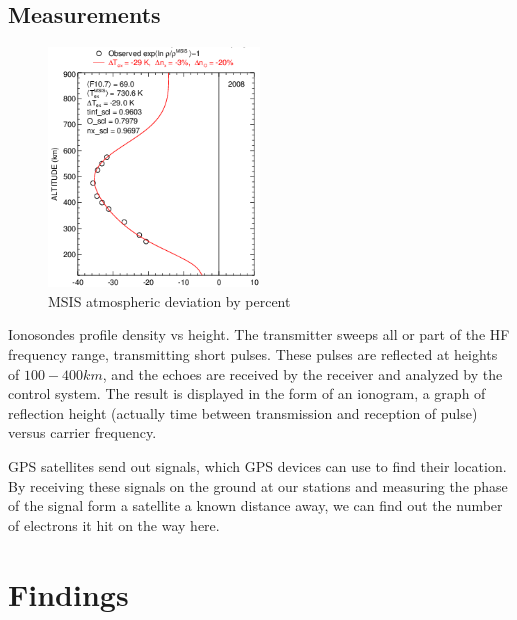 \documentclass[12pt]{IEEEtran}
\begin{document}
\subsection{Measurements}
  \begin{figure}
    \includegraphics[height=2.5in]{cropped}
    \caption{MSIS atmospheric deviation by percent}
  \end{figure}

Ionosondes profile density vs height.
      The transmitter sweeps all or part of the HF frequency range, transmitting short pulses. These pulses are reflected at heights of $100-400 km$, and the echoes are received by the receiver and analyzed by the control system. The result is displayed in the form of an ionogram, a graph of reflection height (actually time between transmission and reception of pulse) versus carrier frequency.
    
      GPS satellites send out signals, which GPS devices can use to find their location.
    By receiving these signals on the ground at our stations and measuring the phase of the signal form a satellite a known distance away, we can find out the number of electrons it hit on the way here. 
\section{Findings} 
\end{document}

